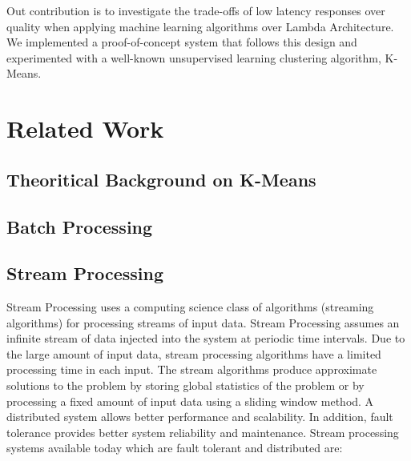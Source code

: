 \documentclass{lmproj}
\begin{document}
Out contribution is to investigate the trade-offs of low latency responses over quality when applying machine learning algorithms over Lambda Architecture. We implemented a proof-of-concept system that follows this design and experimented with a well-known unsupervised learning clustering algorithm, K-Means. 


\chapter{Related Work}
\label{relatedwork}

\section{Theoritical Background on K-Means}
\label{relatedwork}

\section{Batch Processing}
\label{relatedwork}

\section{Stream Processing}
\label{relatedwork}

Stream Processing uses a computing science class of algorithms (streaming algorithms) for processing streams of input data. Stream Processing assumes an infinite stream of data injected into the system at periodic time intervals. Due to the large amount of input data, stream processing algorithms have a limited processing time in each input.  The stream algorithms produce approximate solutions to the problem by storing global statistics of the problem or by processing a fixed amount of input data using a sliding window method.
A distributed system allows better performance and scalability. In addition, fault tolerance provides better system reliability and maintenance. Stream processing systems available today which are fault tolerant and distributed are:
\end{document}
